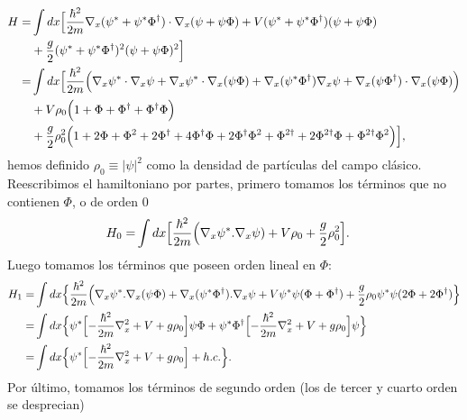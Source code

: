 \begin{align}
\nonumber H=&\int dx \Bigl[\frac{\hbar^2}{2m}\nabla_x(\psi^*+\psi^*\Phi^{\dagger})\cdot\nabla_x(\psi+\psi\Phi)+V(\psi^*+\psi^*\Phi^{\dagger})(\psi+\psi\Phi)\\
\nonumber &+\frac{g}{2}(\psi^*+\psi^*\Phi^{\dagger})^2(\psi+\psi\Phi)^2\Bigr]\\
\nonumber =&\int dx \Bigl[\frac{\hbar^2}{2m}\Bigl(\nabla_x\psi^*\cdot\nabla_x \psi+\nabla_x\psi^*\cdot\nabla_x (\psi\Phi)+\nabla_x (\psi^*\Phi^{\dagger})\nabla_x\psi+\nabla_x(\psi\Phi^{\dagger})\cdot\nabla_x(\psi\Phi)\Bigr)\\
\nonumber &+V\rho_0\Bigl(1+ \Phi+\Phi^{\dagger}+\Phi^{\dagger}\Phi\Bigr)\\
 &+\frac{g}{2}\rho_0^2\Bigl(1+2\Phi+\Phi^2+2\Phi^{\dagger}+4\Phi^{\dagger}\Phi+2\Phi^{\dagger}\Phi^2+\Phi^{2\dagger}+2\Phi^{2\dagger}\Phi+\Phi^{2\dagger}\Phi^2\Bigr)\Bigr],
\end{align}
hemos definido $\rho_0\equiv|\psi|^2$ como la densidad de part\'{i}culas del campo cl\'{a}sico.  Reescribimos el hamiltoniano por partes, primero tomamos los t\'{e}rminos que no contienen $\Phi$,	 o de orden $0$
\begin{align}
H_0=&\int dx \Bigl[\frac{\hbar^2}{2m}\Bigl(\nabla_x\psi^*.\nabla_x \psi)+V\rho_0+\frac{g}{2}\rho_0^2\Bigr].
\end{align}
Luego tomamos los t\'{e}rminos que poseen orden lineal en $\Phi$:
\begin{align}
\nonumber H_1=&\int dx \Bigl\{\frac{\hbar^2}{2m} \Bigl(\nabla_x\psi^*.\nabla_x(\psi \Phi)+\nabla_x(\psi^* \Phi^{\dagger}).\nabla_x\psi+V\psi^*\psi(\Phi+\Phi^{\dagger})+\frac{g}{2}\rho_0\psi^*\psi(2\Phi+2\Phi^{\dagger})\Bigr\}\\
\nonumber =&\int dx\Big\{ \psi^*\Bigl[-\frac{\hbar^2}{2m} \nabla_x^2+V+g\rho_0\Bigr]\psi\Phi+\psi^*\Phi^{\dagger}\Bigl[-\frac{\hbar^2}{2m} \nabla_x^2+V+g\rho_0\Bigr]\psi\Bigr\}\\
=&\int dx\Big\{ \psi^*\Bigl[-\frac{\hbar^2}{2m} \nabla_x^2+V+g\rho_0\Bigr]+h.c.\Bigr\}.
\end{align}
Por \'{u}ltimo, tomamos los t\'{e}rminos de segundo orden (los de tercer y cuarto orden se desprecian)

